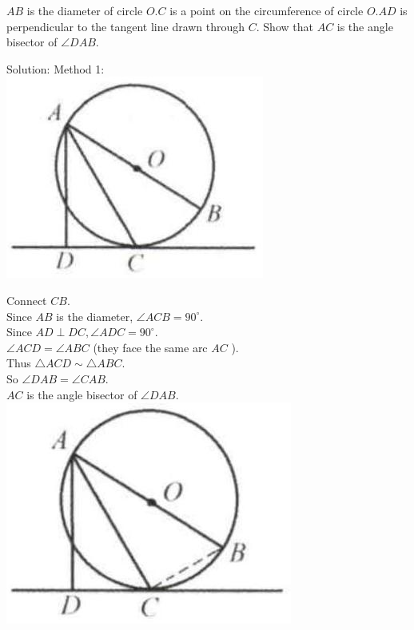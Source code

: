 \documentclass{article}
\begin{document}
\(A B\) is the diameter of circle \(O . C\) is a point on the circumference of circle \(O . A D\) is perpendicular to the tangent line drawn through \(C\). Show that \(A C\) is the angle bisector of \(\angle D A B\).

Solution:
Method 1:\\
\centering
\includegraphics[width=\textwidth]{images/164(1).jpg}

Connect \(C B\).\\
Since \(A B\) is the diameter, \(\angle A C B=90^{\circ}\).\\
Since \(A D \perp D C, \angle A D C=90^{\circ}\).\\
\(\angle A C D=\angle A B C\) (they face the same arc \(A C\) ).\\
Thus \(\triangle A C D \sim \triangle A B C\).\\
So \(\angle D A B=\angle C A B\).\\
\(A C\) is the angle bisector of \(\angle D A B\).\\
\centering
\includegraphics[width=\textwidth]{images/164(2).jpg}
\end{document}
